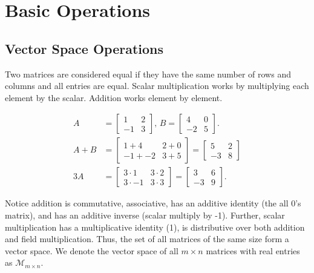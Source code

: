 \section{Basic Operations}

\subsection{Vector Space Operations}
Two matrices are considered equal if they have the same number of rows and columns and all entries are equal.
Scalar multiplication works by multiplying each element by the scalar.
Addition works element by element.

\begin{example}
	\begin{align*}
		A &= \begin{bmatrix}
			1 & 2 \\
			-1 & 3
		\end{bmatrix} \text{, } B = \begin{bmatrix}
			4 & 0 \\
			-2 & 5
		\end{bmatrix}. \\
		A + B &= \begin{bmatrix}
			1 + 4 & 2 + 0 \\
			-1 + -2 & 3 + 5
		\end{bmatrix} = \begin{bmatrix}
			5 & 2 \\
			-3 & 8
		\end{bmatrix} \\
		3A &= \begin{bmatrix}
			3\cdot1 & 3\cdot 2 \\
			3\cdot -1 & 3\cdot 3
		\end{bmatrix} = \begin{bmatrix}
			3 & 6 \\
			-3 & 9
		\end{bmatrix}.
	\end{align*}
\end{example}

Notice addition is commutative, associative, has an additive identity (the all 0's matrix), and has an additive inverse (scalar multiply by -1).
Further, scalar multiplication has a multiplicative identity (1), is distributive over both addition and field multiplication.
Thus, the set of all matrices of the same size form a vector space.
We denote the vector space of all $m \times n$ matrices with real entries as $\mathcal{M}_{m \times n}$.

